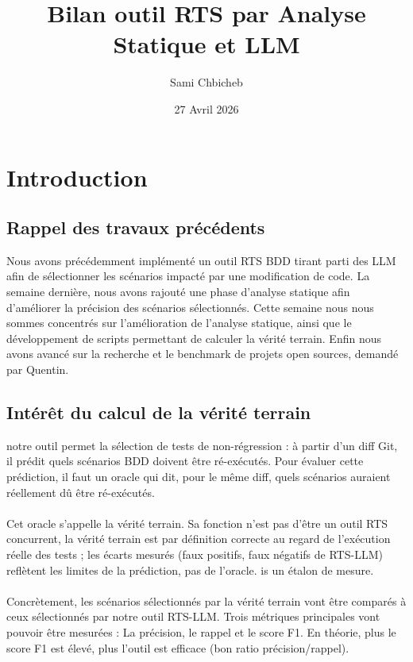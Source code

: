 \documentclass[12pt,a4paper]{article}
\title{\textbf{Bilan outil RTS par Analyse Statique et LLM}}
\author{Sami Chbicheb}
\date{27 Avril 2026}
\begin{document}
\maketitle

\tableofcontents
\newpage

\section{Introduction}

\subsection{Rappel des travaux précédents}

Nous avons précédemment implémenté un outil RTS BDD tirant parti des LLM afin de sélectionner les scénarios impacté par une modification de code. La semaine dernière, nous avons rajouté une phase d'analyse statique afin d'améliorer la précision des scénarios sélectionnés. Cette semaine nous nous sommes concentrés sur l'amélioration de l'analyse statique, ainsi que le développement de scripts permettant de calculer la vérité terrain. Enfin nous avons avancé sur la recherche et le benchmark de projets open sources, demandé par Quentin.

\subsection{Intérêt du calcul de la vérité terrain}
 notre outil permet la sélection de tests de non-régression : à partir d'un diff Git, il prédit quels scénarios BDD doivent être ré-exécutés. Pour évaluer cette prédiction, il faut un oracle qui dit, pour le même diff, quels scénarios auraient réellement dû être ré-exécutés.
\\\\
Cet oracle s'appelle la vérité terrain. Sa fonction n'est pas d'être un outil RTS concurrent, la vérité terrain est par définition correcte au regard de l'exécution réelle des tests ; les écarts mesurés (faux positifs, faux négatifs de RTS-LLM) reflètent les limites de la prédiction, pas de l'oracle. is un étalon de mesure.
\\\\
Concrètement, les scénarios sélectionnés par la vérité terrain vont être comparés à ceux sélectionnés par notre outil RTS-LLM. Trois métriques principales vont pouvoir être mesurées : La précision, le rappel et le score F1. En théorie, plus le score F1 est élevé, plus l'outil est efficace (bon ratio précision/rappel).\\\\
                                   
\end{document}
